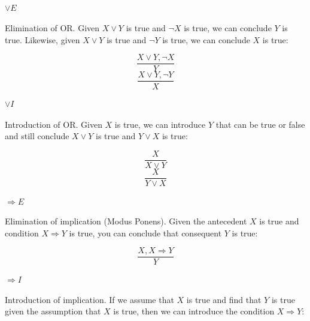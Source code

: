 \documentclass{article}
\begin{document}
\begin{multicols}{2}
  \paragraph{$\lor E$} Elimination of OR. Given $X \lor Y$ is true and $\lnot X$ is true, we can conclude $Y$ is true. Likewise, given $X \lor Y$ is true and $\lnot Y$ is true, we can conclude $X$ is true:
  
  \begin{multicols}{2}
  \begin{equation*}  
  \frac{X \lor Y, \lnot X}{Y}
  \end{equation*}
  \break
  \begin{equation*}  
  \frac{X \lor Y, \lnot Y}{X}
  \end{equation*}
  \end{multicols}
  
  \paragraph{$\lor I$} Introduction of OR. Given $X$ is true, we can introduce $Y$ that can be true or false and still conclude $X \lor Y$ is true and $Y \lor X$ is true:
  
  \begin{multicols}{2}
  \begin{equation*}  
  \frac{X}{X \lor Y}
  \end{equation*}
  \break
  \begin{equation*}  
  \frac{X}{Y \lor X}
  \end{equation*}
  \end{multicols}
  
  \paragraph{$\Rightarrow E$} Elimination of implication (Modus Ponens). Given the antecedent $X$ is true and condition $X \Rightarrow Y$ is true, you can conclude that consequent $Y$ is true:
  
  \begin{equation*}  
  \frac{X, X \Rightarrow Y}{Y}
  \end{equation*}
  
  \paragraph{$\Rightarrow I$} Introduction of implication. If we assume that $X$ is true and find that $Y$ is true given the assumption that $X$ is true, then we can introduce the condition $X \Rightarrow Y$:
  

\end{multicols}
\end{document}
